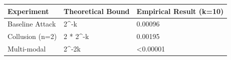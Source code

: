 \begin{tabular}{lll}
\toprule
Experiment & Theoretical Bound & Empirical Result (k=10) \\
\midrule
Baseline Attack & 2^-k & 0.00096 \\
Collusion (n=2) & 2 * 2^-k & 0.00195 \\
Multi-modal & 2^-2k & <0.00001 \\
\bottomrule
\end{tabular}
